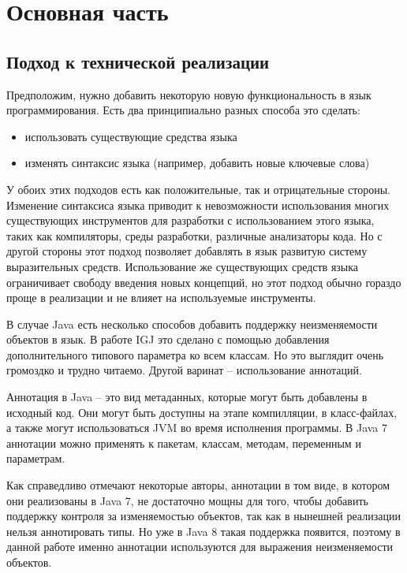 \chapter{Основная часть}

\section{Подход к технической реализации}

Предположим, нужно добавить некоторую новую функциональность в язык программирования. Есть два принципиально разных способа это сделать:
\begin{itemize}
	\item использовать существующие средства языка
	\item изменять синтаксис языка (например, добавить новые ключевые слова)
\end{itemize}

У обоих этих подходов есть как положительные, так и отрицательные стороны. Изменение синтаксиса языка приводит к невозможности использования многих существующих инструментов для разработки с использованием этого языка, таких как компиляторы, среды разработки, различные анализаторы кода. Но с другой стороны этот подход позволяет добавлять в язык развитую систему выразительных средств. Использование же существующих средств языка ограничивает свободу введения новых концепций, но этот подход обычно гораздо проще в реализации и не влияет на используемые инструменты.

В случае Java есть несколько способов добавить поддержку неизменяемости объектов в язык. В работе IGJ это сделано с помощью добавления дополнительного типового параметра ко всем классам. Но это выглядит очень громоздко и трудно читаемо. Другой варинат -- использование аннотаций. 

Аннотация в Java -- это вид метаданных, которые могут быть добавлены в исходный код. Они могут быть доступны на этапе компилляции, в класс-файлах, а также могут использоваться JVM во время исполнения программы. В Java 7 аннотации можно применять к пакетам, классам, методам, переменным и параметрам. 

Как справедливо отмечают некоторые авторы, аннотации в том виде, в котором они реализованы в Java 7, не достаточно мощны для того, чтобы добавить поддержку контроля за изменяемостью объектов, так как в нынешней реализации нельзя аннотировать типы. Но уже в Java 8 такая поддержка появится, поэтому в данной работе именно аннотации используются для выражения неизменяемости объектов.

